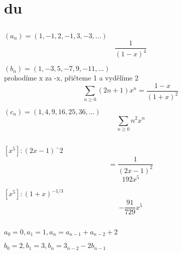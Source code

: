 \documentclass[a4paper]{article}
\begin{document}
\section{du}
\subsection{}

$
(a_n) = (1, -1, 2, -1, 3, -3, ...)
$
$$
\frac{1}{(1-x)^4}
$$

$
(b_n) = (1, -3, 5, -7, 9, -11, ...)
$
\\
prohodíme x za -x, přičteme 1 a vydělíme 2
$$
\sum_{n \geq 0}(2n + 1)x^n = 
\frac{1-x}{(1+x)^2}
$$


$
(c_n) = (1, 4, 9, 16, 25, 36, ...)
$
$$
\sum_{n \geq 0} n^2 x^n 
$$

\subsection{}
$
[x^5] : (2x - 1)^-2
$
$$
=\frac{1}{(2x-1)^2}
$$
$$
192x^5
$$

$
[x^5] : (1 + x)^{-1/3}
$
$$
-\frac{91}{729} x^5
$$


\subsection{}
$
a_0 = 0, a_1 = 1, a_n = a_{n-1} + a_{n-2} + 2
$
$$
$$

$
b_0 = 2, b_1 = 3, b_n = 3_{n-2} - 2b_{n-1}
$
$$
$$
\end{document}
